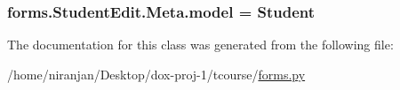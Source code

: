 \subsubsection[{\texorpdfstring{model}{model}}]{\setlength{\rightskip}{0pt plus 5cm}forms.\+Student\+Edit.\+Meta.\+model = {\bf Student}\hspace{0.3cm}{\ttfamily [static]}}\hypertarget{classforms_1_1_student_edit_1_1_meta_a809ec2e557f759854d783ce4937e2ec3}{}\label{classforms_1_1_student_edit_1_1_meta_a809ec2e557f759854d783ce4937e2ec3}


The documentation for this class was generated from the following file\+:\begin{DoxyCompactItemize}
\item 
/home/niranjan/\+Desktop/dox-\/proj-\/1/tcourse/\hyperlink{forms_8py}{forms.\+py}\end{DoxyCompactItemize}
